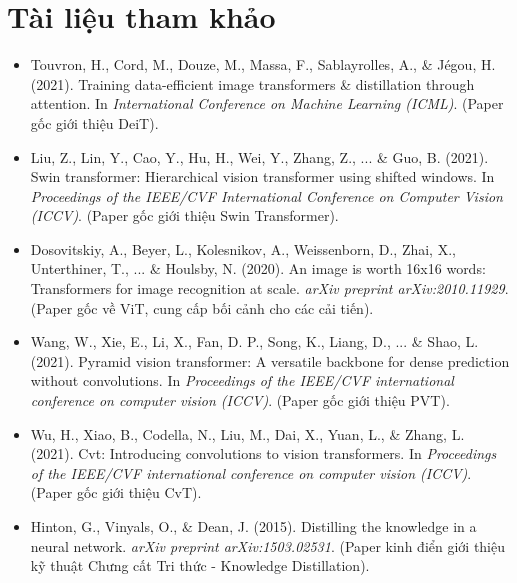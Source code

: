 \section*{Tài liệu tham khảo}
\begin{itemize}
	\item[1] Touvron, H., Cord, M., Douze, M., Massa, F., Sablayrolles, A., \& Jégou, H. (2021). Training data-efficient image transformers \& distillation through attention. In \textit{International Conference on Machine Learning (ICML)}. (Paper gốc giới thiệu DeiT).
	\item[2] Liu, Z., Lin, Y., Cao, Y., Hu, H., Wei, Y., Zhang, Z., ... \& Guo, B. (2021). Swin transformer: Hierarchical vision transformer using shifted windows. In \textit{Proceedings of the IEEE/CVF International Conference on Computer Vision (ICCV)}. (Paper gốc giới thiệu Swin Transformer).
	\item[3] Dosovitskiy, A., Beyer, L., Kolesnikov, A., Weissenborn, D., Zhai, X., Unterthiner, T., ... \& Houlsby, N. (2020). An image is worth 16x16 words: Transformers for image recognition at scale. \textit{arXiv preprint arXiv:2010.11929}. (Paper gốc về ViT, cung cấp bối cảnh cho các cải tiến).
	\item[4] Wang, W., Xie, E., Li, X., Fan, D. P., Song, K., Liang, D., ... \& Shao, L. (2021). Pyramid vision transformer: A versatile backbone for dense prediction without convolutions. In \textit{Proceedings of the IEEE/CVF international conference on computer vision (ICCV)}. (Paper gốc giới thiệu PVT).
	\item[5] Wu, H., Xiao, B., Codella, N., Liu, M., Dai, X., Yuan, L., \& Zhang, L. (2021). Cvt: Introducing convolutions to vision transformers. In \textit{Proceedings of the IEEE/CVF international conference on computer vision (ICCV)}. (Paper gốc giới thiệu CvT).
	\item[6] Hinton, G., Vinyals, O., \& Dean, J. (2015). Distilling the knowledge in a neural network. \textit{arXiv preprint arXiv:1503.02531}. (Paper kinh điển giới thiệu kỹ thuật Chưng cất Tri thức - Knowledge Distillation).
\end{itemize}